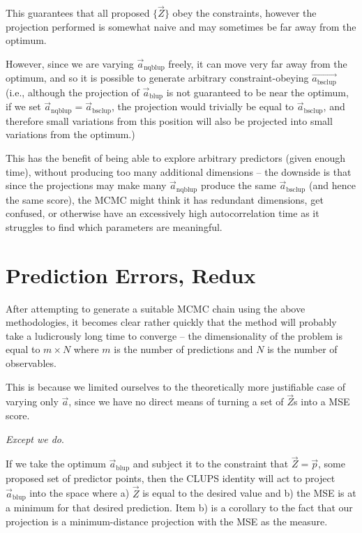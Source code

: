 \documentclass[]{article}
\begin{document}
				This guarantees that all proposed $\{\vec{Z}\}$ obey the constraints, however the projection performed is somewhat naive and may sometimes be far away from the optimum. 

				However, since we are varying $\vec{a}_\text{nqblup}$ freely, it can move very far away from the optimum, and so it is possible to generate arbitrary constraint-obeying $\vec{a_\text{bsclup}}$ (i.e., although the projection of $\vec{a}_\text{blup}$ is not guaranteed to be near the optimum, if we set $\vec{a}_\text{nqblup} = \vec{a}_\text{bsclup}$, the projection would trivially be equal to $\vec{a}_\text{bsclup}$, and therefore small variations from this position will also be projected into small variations from the optimum.)

				This has the benefit of being able to explore arbitrary predictors (given enough time), without producing too many additional dimensions -- the downside is that since the projections may make many $\vec{a}_\text{nqblup}$ produce the same $\vec{a}_\text{bsclup}$ (and hence the same score), the MCMC might think it has redundant dimensions, get confused, or otherwise have an excessively high autocorrelation time as it struggles to find which parameters are meaningful.
	\newpage
	\section{Prediction Errors, Redux}

		After attempting to generate a suitable MCMC chain using the above methodologies, it becomes clear rather quickly that the method will probably take a ludicrously long time to converge -- the dimensionality of the problem is equal to $m\times N$ where $m$ is the number of predictions and $N$ is the number of observables. 

		This is because we limited ourselves to the theoretically more justifiable case of varying only $\vec{a}$, since we have no direct means of turning a set of $\vec{Z}$s into a MSE score. 
		
		\textit{Except we do}.

		If we take the optimum $\vec{a}_\text{blup}$ and subject it to the constraint that $\vec{Z} = \vec{p}$, some proposed set of predictor points, then the CLUPS identity will act to project $\vec{a}_\text{blup}$ into the space where a) $\vec{Z}$ is equal to the desired value and b) the MSE is at a minimum for that desired prediction. Item b) is a corollary to the fact that our projection is a minimum-distance projection with the MSE as the measure.
\end{document}
